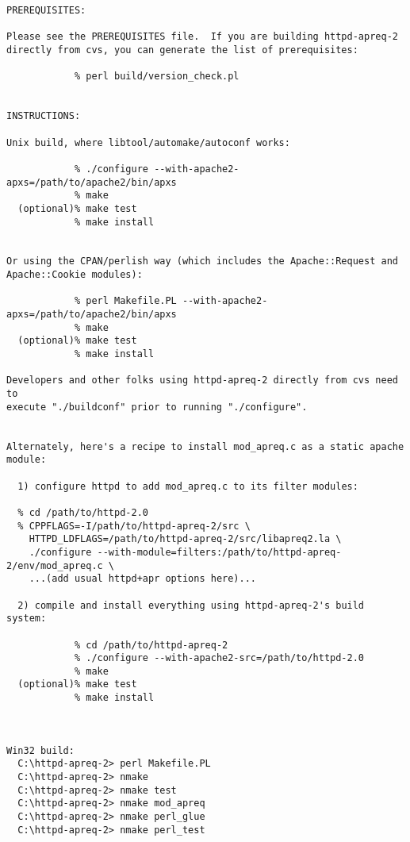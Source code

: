 

\footnotesize\begin{verbatim}PREREQUISITES:

Please see the PREREQUISITES file.  If you are building httpd-apreq-2 
directly from cvs, you can generate the list of prerequisites:

            % perl build/version_check.pl


INSTRUCTIONS:

Unix build, where libtool/automake/autoconf works:

            % ./configure --with-apache2-apxs=/path/to/apache2/bin/apxs
            % make
  (optional)% make test
            % make install


Or using the CPAN/perlish way (which includes the Apache::Request and
Apache::Cookie modules):

            % perl Makefile.PL --with-apache2-apxs=/path/to/apache2/bin/apxs
            % make
  (optional)% make test
            % make install

Developers and other folks using httpd-apreq-2 directly from cvs need to
execute "./buildconf" prior to running "./configure".


Alternately, here's a recipe to install mod_apreq.c as a static apache module:

  1) configure httpd to add mod_apreq.c to its filter modules:

  % cd /path/to/httpd-2.0
  % CPPFLAGS=-I/path/to/httpd-apreq-2/src \
    HTTPD_LDFLAGS=/path/to/httpd-apreq-2/src/libapreq2.la \
    ./configure --with-module=filters:/path/to/httpd-apreq-2/env/mod_apreq.c \
    ...(add usual httpd+apr options here)...

  2) compile and install everything using httpd-apreq-2's build system:

            % cd /path/to/httpd-apreq-2
            % ./configure --with-apache2-src=/path/to/httpd-2.0
            % make
  (optional)% make test
            % make install



Win32 build:
  C:\httpd-apreq-2> perl Makefile.PL
  C:\httpd-apreq-2> nmake
  C:\httpd-apreq-2> nmake test
  C:\httpd-apreq-2> nmake mod_apreq
  C:\httpd-apreq-2> nmake perl_glue
  C:\httpd-apreq-2> nmake perl_test



\end{verbatim}\normalsize
